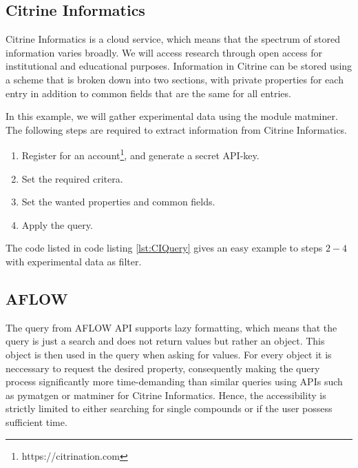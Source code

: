 \subsection{Citrine Informatics}

Citrine Informatics is a cloud service, which means that the spectrum of stored information varies broadly. We will access research through open access for institutional and educational purposes. Information in Citrine can be stored using a scheme that is broken down into two sections, with private properties for each entry in addition to common fields that are the same for all entries.%

In this example, we will gather experimental data using the module matminer. The following steps are required to extract information from Citrine Informatics.

\begin{enumerate}
  \item Register for an account\footnote{https://citrination.com}, and generate a secret API-key.
  \item Set the required critera.
  \item Set the wanted properties and common fields.
  \item Apply the query.
\end{enumerate}

The code listed in code listing \ref{lst:CIQuery} gives an easy example to steps $2-4$ with experimental data as filter.



\subsection{AFLOW}

The query from AFLOW API \cite{Curtarolo2012} supports lazy formatting, which means that the query is just a search and does not return values but rather an object. This object is then used in the query when asking for values. For every object it is neccessary to request the desired property, consequently making the query process significantly more time-demanding than similar queries using APIs such as pymatgen or matminer for Citrine Informatics. Hence, the accessibility is strictly limited to either searching for single compounds or if the user possess sufficient time.

